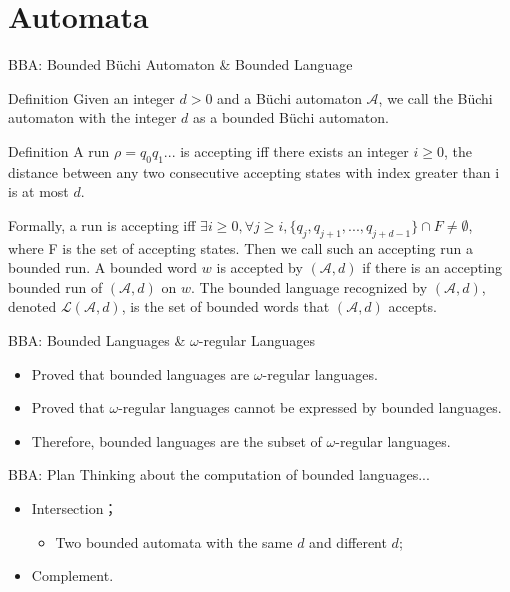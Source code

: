 \documentclass[aspectratio=1610]{beamer}
\newcommand{\buchi}{B\"uchi }
\begin{document}
\section{Automata}
\begin{frame}{BBA: Bounded \buchi Automaton \& Bounded Language}
\begin{block}{Definition}
    Given an integer $d > 0$ and a \buchi automaton $\mathcal{A}$, we call the \buchi automaton with the integer $d$ as a bounded \buchi automaton.
\end{block}
\begin{block}{Definition}
    A run $\rho=q_{0}q_{1}...$ is accepting iff there exists an integer $i \geq 0$, the distance between any two consecutive accepting states with index greater than i is at most $d$. 
    
    Formally, a run is accepting iff $\exists i \geq 0, \forall j \geq i, \{q_{j},q_{j+1},...,q_{j+d-1}\} \cap F \ne \emptyset$, where F is the set of accepting states. Then we call such an accepting run a bounded run. A bounded word $w$ is accepted by $(\mathcal{A}, d)$ if there is an accepting bounded run of $(\mathcal{A}, d)$ on $w$. The bounded language recognized by $(\mathcal{A}, d)$, denoted $\mathcal{L(A,\textit{d})}$, is the set of bounded words that $(\mathcal{A},d)$ accepts. 
\end{block}

\end{frame}



\begin{frame}{BBA: Bounded Languages \& $\omega$-regular Languages}
    \begin{itemize}
        \item Proved that bounded languages are $\omega$-regular languages.
        \item Proved that $\omega$-regular languages cannot be expressed by bounded languages. 
        \item Therefore, bounded languages are the subset of $\omega$-regular languages.
    \end{itemize}
\end{frame}

\begin{frame}{BBA: Plan}
    Thinking about the computation of bounded languages...
    \begin{itemize}
        \item Intersection；
        \begin{itemize}
            \item Two bounded automata with the same $d$ and different $d$;
        \end{itemize}
        \item Complement.
    \end{itemize}
\end{frame}
\end{document}
